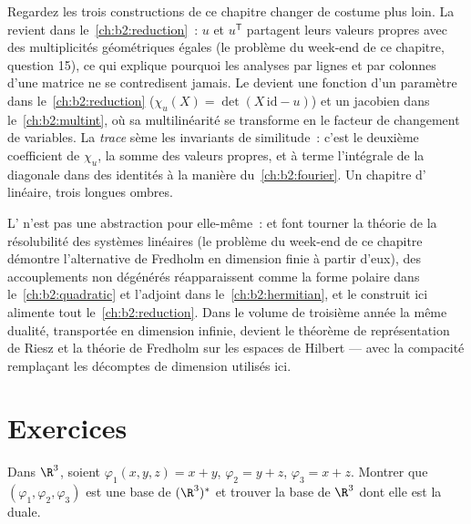 \begin{remark}\label{rem:b2:linalg:perspectives}
Regardez les trois constructions de ce chapitre changer de costume
plus loin. La \emph{} revient dans
le~\cref{ch:b2:reduction}~: $u$ et $u^{\mathsf T}$ partagent leurs
valeurs propres avec des multiplicités géométriques égales (le
problème du week-end de ce chapitre, question 15), ce qui explique
pourquoi les analyses par lignes et par colonnes d'une matrice ne se
contredisent jamais. Le \emph{}
devient une fonction d'un paramètre dans le~\cref{ch:b2:reduction}
($\chi_u(X) = \det(X\,\mathrm{id} - u)$) et un jacobien dans
le~\cref{ch:b2:multint}, où sa multilinéarité se transforme en le
facteur de changement de variables. La \emph{trace} sème les
invariants de similitude~: c'est le deuxième coefficient de
$\chi_u$, la somme des valeurs propres, et à terme l'intégrale
de la diagonale dans des identités à la manière du~\cref{ch:b2:fourier}.
Un chapitre d' linéaire, trois longues ombres.
\end{remark}

\begin{remark}
L' n'est pas une abstraction pour elle-même~: 
et  font tourner la théorie de la résolubilité des systèmes
linéaires (le problème du week-end de ce chapitre démontre l'alternative
de Fredholm en dimension finie à partir d'eux), des accouplements non
dégénérés réapparaissent comme la forme polaire dans
le~\cref{ch:b2:quadratic} et l'adjoint dans
le~\cref{ch:b2:hermitian}, et le  construit ici alimente
tout le~\cref{ch:b2:reduction}. Dans le volume de troisième année la
même dualité, transportée en dimension infinie, devient le théorème de
représentation de Riesz et la théorie de Fredholm sur les espaces de
Hilbert --- avec la compacité remplaçant les décomptes de dimension
utilisés ici.
\end{remark}

\section{Exercices}

\begin{exercise}[$\star$]\label{exo:b2:linalg:1}
Dans $\R^3$, soient $\varphi_1(x,y,z) = x + y$, $\varphi_2 = y + z$,
$\varphi_3 = x + z$. Montrer que $(\varphi_1, \varphi_2, \varphi_3)$
est une base de $(\R^3)^*$ et trouver la base de $\R^3$ dont elle est
la duale.
\end{exercise}

